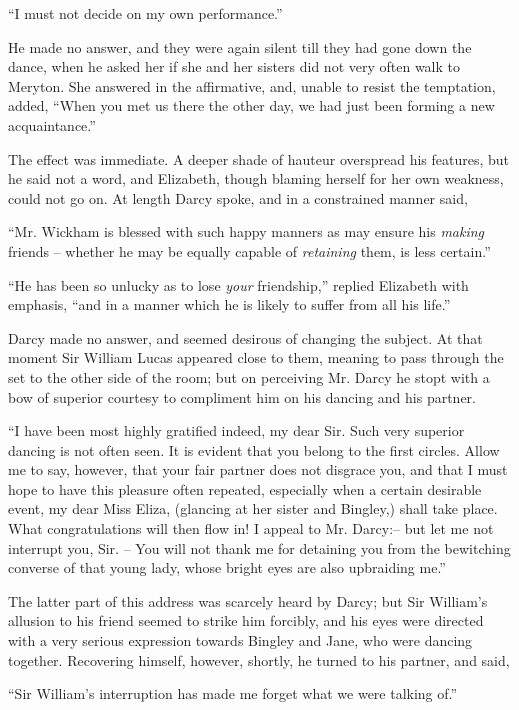 “I must not decide on my own performance.”

He made no answer, and they were again silent till they
had gone down the dance, when he asked her if she and
her sisters did not very often walk to Meryton. She
answered in the affirmative, and, unable to resist the
temptation, added, “When you met us there the other
day, we had just been forming a new acquaintance.”

The effect was immediate. A deeper shade of hauteur
overspread his features, but he said not a word, and
Elizabeth, though blaming herself for her own weakness,
could not go on. At length Darcy spoke, and in a constrained
manner said,

“Mr. Wickham is blessed with such happy manners as
may ensure his \textit{making} friends -- whether he may be equally
capable of \textit{retaining} them, is less certain.”

“He has been so unlucky as to lose \textit{your} friendship,”
replied Elizabeth with emphasis, “and in a manner which
he is likely to suffer from all his life.”

Darcy made no answer, and seemed desirous of changing
the subject. At that moment Sir William Lucas appeared
close to them, meaning to pass through the set to the other
side of the room; but on perceiving Mr. Darcy he stopt
with a bow of superior courtesy to compliment him on
his dancing and his partner.

“I have been most highly gratified indeed, my dear Sir.
Such very superior dancing is not often seen. It is evident
that you belong to the first circles. Allow me to say,
however, that your fair partner does not disgrace you,
and that I must hope to have this pleasure often repeated,
especially when a certain desirable event, my dear Miss
Eliza, (glancing at her sister and Bingley,) shall take place.
What congratulations will then flow in! I appeal to
Mr. Darcy:-- but let me not interrupt you, Sir. -- You will
not thank me for detaining you from the bewitching
converse of that young lady, whose bright eyes are also
upbraiding me.”

The latter part of this address was scarcely heard by
Darcy; but Sir William’s allusion to his friend seemed to
strike him forcibly, and his eyes were directed with a very
serious expression towards Bingley and Jane, who were
dancing together. Recovering himself, however, shortly,
he turned to his partner, and said,

“Sir William’s interruption has made me forget what
we were talking of.”

